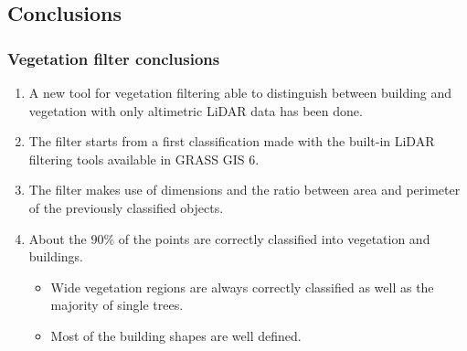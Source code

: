 \subsection{Conclusions}
\begin{frame}
  \frametitle{Vegetation filter conclusions}
    \begin{enumerate}
        \item A new tool for vegetation filtering able to distinguish between building and vegetation with only altimetric LiDAR data has been done.
	\item The filter starts from a first classification made with the built-in LiDAR filtering tools available in GRASS GIS 6.
	\item The filter makes use of dimensions and the ratio between area and perimeter of the previously classified objects.
	\item About the $90\%$ of the points are correctly classified into vegetation and buildings.
	    \begin{itemize}
		\item Wide vegetation regions are always correctly classified as well as the majority of single trees.
		\item Most of the building shapes are well defined.
	    \end{itemize}
    \end{enumerate}
\end{frame}
